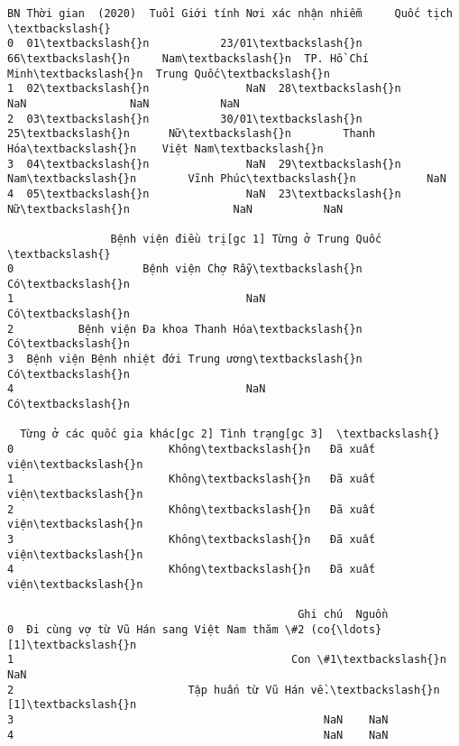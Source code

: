 \documentclass[11pt]{article}
\makeatletter
\newcommand{\boxspacing}{\kern\kvtcb@left@rule\kern\kvtcb@boxsep}
\newcommand{\prompt}[4]{
        \ttfamily\llap{{\color{#2}[#3]:\hspace{3pt}#4}}\vspace{-\baselineskip}
    }
\makeatother
\begin{document}
            \begin{tcolorbox}[breakable, size=fbox, boxrule=.5pt, pad at break*=1mm, opacityfill=0]
\prompt{Out}{outcolor}{62}{\boxspacing}
\begin{Verbatim}[commandchars=\\\{\}]
     BN Thời gian  (2020)  Tuổi Giới tính Nơi xác nhận nhiễm     Quốc tịch  \textbackslash{}
0  01\textbackslash{}n           23/01\textbackslash{}n  66\textbackslash{}n     Nam\textbackslash{}n  TP. Hồ Chí Minh\textbackslash{}n  Trung Quốc\textbackslash{}n
1  02\textbackslash{}n               NaN  28\textbackslash{}n       NaN                NaN           NaN
2  03\textbackslash{}n           30/01\textbackslash{}n  25\textbackslash{}n      Nữ\textbackslash{}n        Thanh Hóa\textbackslash{}n    Việt Nam\textbackslash{}n
3  04\textbackslash{}n               NaN  29\textbackslash{}n     Nam\textbackslash{}n        Vĩnh Phúc\textbackslash{}n           NaN
4  05\textbackslash{}n               NaN  23\textbackslash{}n      Nữ\textbackslash{}n                NaN           NaN

                Bệnh viện điều trị[gc 1] Từng ở Trung Quốc  \textbackslash{}
0                    Bệnh viện Chợ Rẫy\textbackslash{}n              Có\textbackslash{}n
1                                    NaN              Có\textbackslash{}n
2          Bệnh viện Đa khoa Thanh Hóa\textbackslash{}n              Có\textbackslash{}n
3  Bệnh viện Bệnh nhiệt đới Trung ương\textbackslash{}n              Có\textbackslash{}n
4                                    NaN              Có\textbackslash{}n

  Từng ở các quốc gia khác[gc 2] Tình trạng[gc 3]  \textbackslash{}
0                        Không\textbackslash{}n   Đã xuất viện\textbackslash{}n
1                        Không\textbackslash{}n   Đã xuất viện\textbackslash{}n
2                        Không\textbackslash{}n   Đã xuất viện\textbackslash{}n
3                        Không\textbackslash{}n   Đã xuất viện\textbackslash{}n
4                        Không\textbackslash{}n   Đã xuất viện\textbackslash{}n

                                             Ghi chú  Nguồn
0  Đi cùng vợ từ Vũ Hán sang Việt Nam thăm \#2 (co{\ldots}  [1]\textbackslash{}n
1                                           Con \#1\textbackslash{}n    NaN
2                           Tập huấn từ Vũ Hán về.\textbackslash{}n  [1]\textbackslash{}n
3                                                NaN    NaN
4                                                NaN    NaN
\end{Verbatim}
\end{tcolorbox}
        
\end{document}
